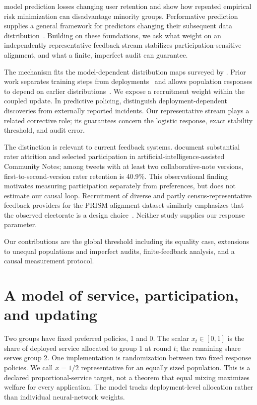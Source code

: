 \documentclass{article}
\begin{document}
\citet{hashimoto2018} model prediction losses changing user retention and show how repeated empirical risk minimization can disadvantage minority groups. Performative prediction supplies a general framework for predictors changing their subsequent data distribution~\citep{perdomo2020}. Building on these foundations, we ask what weight on an independently representative feedback stream stabilizes participation-sensitive alignment, and what a finite, imperfect audit can guarantee.

The mechanism fits the model-dependent distribution maps surveyed by \citet{survey2025}. Prior work separates training steps from deployments~\citep{mendler2020} and allows population responses to depend on earlier distributions~\citep{brown2022}. We expose a recruitment weight within the coupled update. In predictive policing, \citet{ensign2018} distinguish deployment-dependent discoveries from externally reported incidents. Our representative stream plays a related corrective role; its guarantees concern the logistic response, exact stability threshold, and audit error.

The distinction is relevant to current feedback systems. \citet{de2026} document substantial rater attrition and selected participation in artificial-intelligence-assisted Community Notes; among tweets with at least two collaborative-note versions, first-to-second-version rater retention is 40.9\%. This observational finding motivates measuring participation separately from preferences, but does not estimate our causal loop. Recruitment of diverse and partly census-representative feedback providers for the PRISM alignment dataset similarly emphasizes that the observed electorate is a design choice~\citep{kirk2024}. Neither study supplies our response parameter.

Our contributions are the global threshold including its equality case, extensions to unequal populations and imperfect audits, finite-feedback analysis, and a causal measurement protocol.

\section{A model of service, participation, and updating}\label{sec:model}
Two groups have fixed preferred policies, 1 and 0. The scalar $x_t\in[0,1]$ is the share of deployed service allocated to group 1 at round $t$; the remaining share serves group 2. One implementation is randomization between two fixed response policies. We call $x=1/2$ representative for an equally sized population. This is a declared proportional-service target, not a theorem that equal mixing maximizes welfare for every application. The model tracks deployment-level allocation rather than individual neural-network weights.
\end{document}
